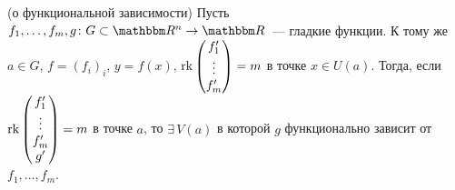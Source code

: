 \documentclass[12pt,timbord]{../../../notes}
\begin{document}
\begin{thrm}(о функциональной зависимости)\label{thrm:diffspace::funcdep}
  Пусть $f_1, \dotsc, f_m, g \colon G \subset \R^n \to \R$~--- гладкие функции. К тому же
  $a\in G$, $f = (f_i)_i$, $y = f(x)$, 
  $
    \operatorname{rk} \begin{pmatrix}
      f_1' \\ \vdots \\ f_m' 
    \end{pmatrix} = m
  $ в точке $x\in U(a)$.
  Тогда, если 
  $
    \operatorname{rk} \begin{pmatrix}
      f_1' \\ \vdots \\ f_m' \\ g' 
    \end{pmatrix} = m
    $ в точке $a$, 
  то $\exists\, V(a)$ в которой $g$ функционально зависит от $f_1, \dotsc,
  f_m$.
\end{thrm}
\end{document}
